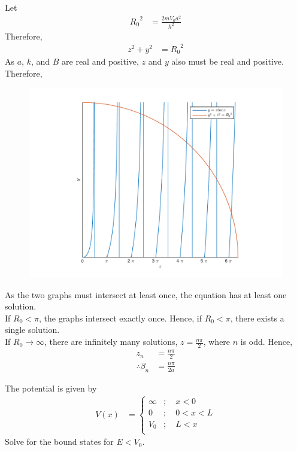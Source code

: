 \documentclass[titlepage, fleqn, a4paper, 12pt, twoside]{article}
\theoremstyle{definition}
\theoremstyle{theorem}
\begin{document}
Let
\begin{align*}
	{R_0}^2 &= \frac{2 m V_0 a^2}{\hbar^2}
\end{align*}
Therefore,
\begin{align*}
	z^2 + y^2 &= {R_0}^2
\end{align*}
As $a$, $k$, and $B$ are real and positive, $z$ and $y$ also must be real and positive.\\
Therefore,
\begin{figure}[H]
	\centering
	\includegraphics[width = \textwidth]{fig-graphical_solution_for_allowed_energy_levels_for_even_wave_functions_in_finite_potential_well.pdf}
\end{figure}
As the two graphs must intersect at least once, the equation has at least one solution.\\
If $R_0 < \pi$, the graphs intersect exactly once.
Hence, if $R_0 < \pi$, there exists a single solution.\\
If $R_0 \to \infty$, there are infinitely many solutions, $z = \frac{n \pi}{2}$, where $n$ is odd.
Hence,
\begin{align*}
	z_n &= \frac{n \pi}{2}\\
	\therefore \beta_n &= \frac{n \pi}{2 a}
\end{align*}

\begin{question}
	The potential is given by
	\begin{align*}
		V(x) &=
			\begin{cases}
				\infty &;\quad x < 0\\
				0 &;\quad 0 < x < L\\
				V_0 &;\quad L < x\\
			\end{cases}
	\end{align*}
	Solve for the bound states for $E < V_0$.
\end{question}
\end{document}
